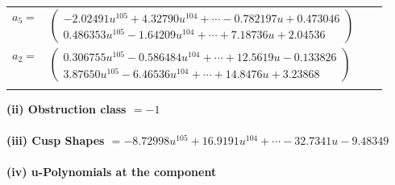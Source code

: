 \documentclass[1p]{elsarticle_modified}
\theoremstyle{definition}
\begin{document}
\begin{tabular}{m{7pt} m{180pt} m{7pt} m{180pt} }
\flushright $a_{5}=$&$\begin{pmatrix}-2.02491 u^{105}+4.32790 u^{104}+\cdots-0.782197 u+0.473046\\0.486353 u^{105}-1.64209 u^{104}+\cdots+7.18736 u+2.04536\end{pmatrix}$ \\
\flushright $a_{2}=$&$\begin{pmatrix}0.306755 u^{105}-0.586484 u^{104}+\cdots+12.5619 u-0.133826\\3.87650 u^{105}-6.46536 u^{104}+\cdots+14.8476 u+3.23868\end{pmatrix}$\\&\end{tabular}
\flushleft \textbf{(ii) Obstruction class $= -1$}\\~\\
\flushleft \textbf{(iii) Cusp Shapes $= -8.72998 u^{105}+16.9191 u^{104}+\cdots-32.7341 u-9.48349$}\\~\\
\newpage\renewcommand{\arraystretch}{1}
\flushleft \textbf{(iv) u-Polynomials at the component}\newline \\
\end{document}
